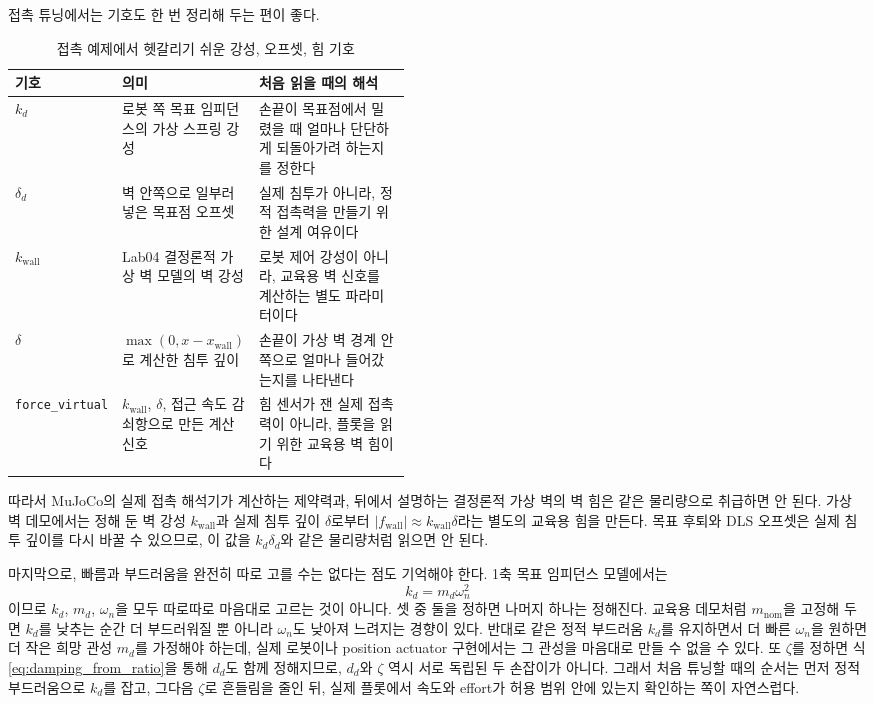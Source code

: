 접촉 튜닝에서는 기호도 한 번 정리해 두는 편이 좋다.
\begin{table}[!htbp]
  \centering
  \caption{접촉 예제에서 헷갈리기 쉬운 강성, 오프셋, 힘 기호}
  \label{tab:contact-symbols}
  \small
  \setlength{\tabcolsep}{4pt}
  \begin{tabularx}{\linewidth}{@{}>{\raggedright\arraybackslash}p{0.18\linewidth}>{\raggedright\arraybackslash}p{0.28\linewidth}>{\raggedright\arraybackslash}X@{}}
    \toprule
    기호 & 의미 & 처음 읽을 때의 해석 \\
    \midrule
    $k_d$ & 로봇 쪽 목표 임피던스의 가상 스프링 강성 & 손끝이 목표점에서 밀렸을 때 얼마나 단단하게 되돌아가려 하는지를 정한다 \\
    $\delta_d$ & 벽 안쪽으로 일부러 넣은 목표점 오프셋 & 실제 침투가 아니라, 정적 접촉력을 만들기 위한 설계 여유이다 \\
    $k_{\mathrm{wall}}$ & Lab04 결정론적 가상 벽 모델의 벽 강성 & 로봇 제어 강성이 아니라, 교육용 벽 신호를 계산하는 별도 파라미터이다 \\
    $\delta$ & $\max(0,x-x_{\mathrm{wall}})$로 계산한 침투 깊이 & 손끝이 가상 벽 경계 안쪽으로 얼마나 들어갔는지를 나타낸다 \\
    \texttt{force\_virtual} & $k_{\mathrm{wall}}$, $\delta$, 접근 속도 감쇠항으로 만든 계산 신호 & 힘 센서가 잰 실제 접촉력이 아니라, 플롯을 읽기 위한 교육용 벽 힘이다 \\
    \bottomrule
  \end{tabularx}
\end{table}

따라서 MuJoCo의 실제 접촉 해석기가 계산하는 제약력과, 뒤에서 설명하는 결정론적 가상 벽의 벽 힘은 같은 물리량으로 취급하면 안 된다.
가상 벽 데모에서는 정해 둔 벽 강성 $k_{\mathrm{wall}}$과 실제 침투 깊이 $\delta$로부터 $|f_{\mathrm{wall}}|\approx k_{\mathrm{wall}}\delta$라는 별도의 교육용 힘을 만든다.
목표 후퇴와 DLS 오프셋은 실제 침투 깊이를 다시 바꿀 수 있으므로, 이 값을 $k_d\delta_d$와 같은 물리량처럼 읽으면 안 된다.

마지막으로, 빠름과 부드러움을 완전히 따로 고를 수는 없다는 점도 기억해야 한다.
1축 목표 임피던스 모델에서는
\begin{equation}
  k_d=m_d\omega_n^2
\end{equation}
이므로 $k_d$, $m_d$, $\omega_n$을 모두 따로따로 마음대로 고르는 것이 아니다.
셋 중 둘을 정하면 나머지 하나는 정해진다.
교육용 데모처럼 $m_{\mathrm{nom}}$을 고정해 두면 $k_d$를 낮추는 순간 더 부드러워질 뿐 아니라 $\omega_n$도 낮아져 느려지는 경향이 있다.
반대로 같은 정적 부드러움 $k_d$를 유지하면서 더 빠른 $\omega_n$을 원하면 더 작은 희망 관성 $m_d$를 가정해야 하는데, 실제 로봇이나 position actuator 구현에서는 그 관성을 마음대로 만들 수 없을 수 있다.
또 $\zeta$를 정하면 식 \eqref{eq:damping_from_ratio}을 통해 $d_d$도 함께 정해지므로, $d_d$와 $\zeta$ 역시 서로 독립된 두 손잡이가 아니다.
그래서 처음 튜닝할 때의 순서는 먼저 정적 부드러움으로 $k_d$를 잡고, 그다음 $\zeta$로 흔들림을 줄인 뒤, 실제 플롯에서 속도와 effort가 허용 범위 안에 있는지 확인하는 쪽이 자연스럽다.

